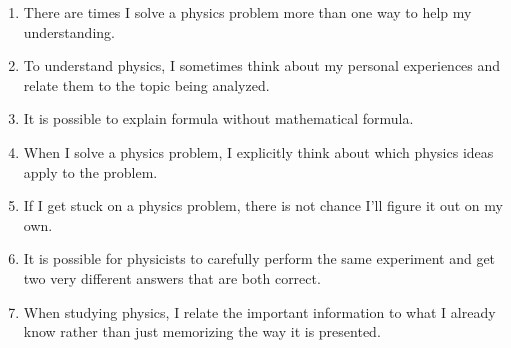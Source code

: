 \documentclass[addpoints,12pt]{exam}
\begin{document}
\begin{enumerate}
\item There are times I solve a physics problem more than one way to help my understanding.
\begin{center}\end{center}

\item To understand physics, I sometimes think about my personal experiences and relate them to the topic being analyzed.
\begin{center}\end{center}

\item It is possible to explain formula without mathematical formula.
\begin{center}\end{center}

\item When I solve a physics problem, I explicitly think about which physics ideas apply to the problem.
\begin{center}\end{center}

\item If I get stuck on a physics problem, there is not chance I'll figure it out on my own.
\begin{center}\end{center}

\item It is possible for physicists to carefully perform the same experiment and get two very different answers that are both correct.
\begin{center}\end{center}

\item When studying physics, I relate the important information to what I already know rather than just memorizing the way it is presented.
\begin{center}\end{center}

\end{enumerate}

	
\end{document}
